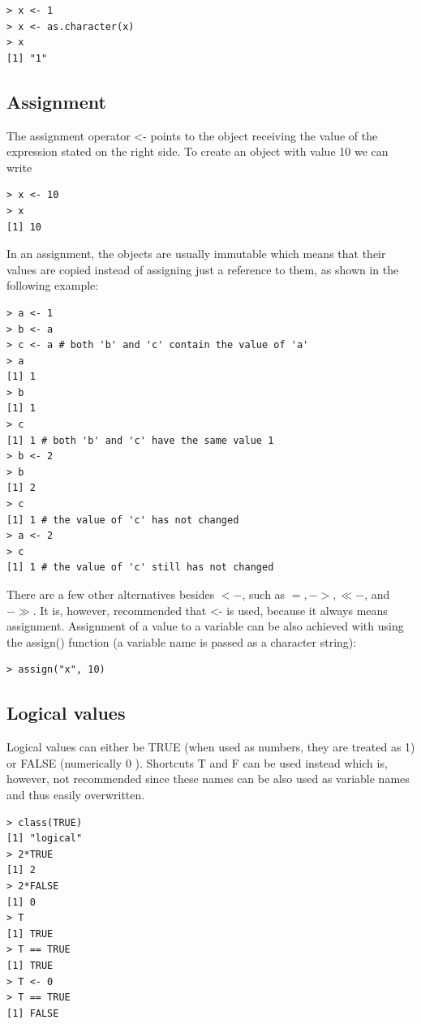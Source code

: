 \documentclass[11pt,openany,executivepaper]{book}
\begin{document}
\begin{verbatim}
> x <- 1
> x <- as.character(x)
> x
[1] "1"
\end{verbatim}

\subsection{Assignment}
The assignment operator <- points to the object receiving the value of the expression stated on the right side. To create an object with value 10 we can write

\begin{verbatim}
> x <- 10
> x
[1] 10
\end{verbatim}

In an assignment, the objects are usually immutable which means that their values are copied instead of assigning just a reference to them, as shown in the following example:

\begin{verbatim}
> a <- 1
> b <- a
> c <- a # both 'b' and 'c' contain the value of 'a'
> a
[1] 1
> b
[1] 1
> c
[1] 1 # both 'b' and 'c' have the same value 1
> b <- 2
> b
[1] 2
> c
[1] 1 # the value of 'c' has not changed
> a <- 2
> c
[1] 1 # the value of 'c' still has not changed
\end{verbatim}

There are a few other alternatives besides $<-$, such as $=,->, \ll-$, and $-\gg$. It is, however, recommended that <- is used, because it always means assignment. Assignment of a value to a variable can be also achieved with using the assign() function (a variable name is passed as a character string):

\begin{verbatim}
> assign("x", 10)
\end{verbatim}

\subsection{Logical values}
Logical values can either be TRUE (when used as numbers, they are treated as 1) or FALSE (numerically 0 ). Shortcuts T and F can be used instead which is, however, not recommended since these names can be also used as variable names and thus easily overwritten.

\begin{verbatim}
> class(TRUE)
[1] "logical"
> 2*TRUE
[1] 2
> 2*FALSE
[1] 0
> T
[1] TRUE
> T == TRUE
[1] TRUE
> T <- 0
> T == TRUE
[1] FALSE
\end{verbatim}
\end{document}
